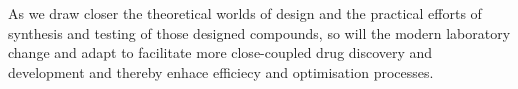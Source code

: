 As we draw closer the theoretical worlds of design and the practical efforts of synthesis and testing of those designed compounds, so will the modern laboratory change and adapt to facilitate more close-coupled drug discovery and development and thereby enhace efficiecy and optimisation processes.



